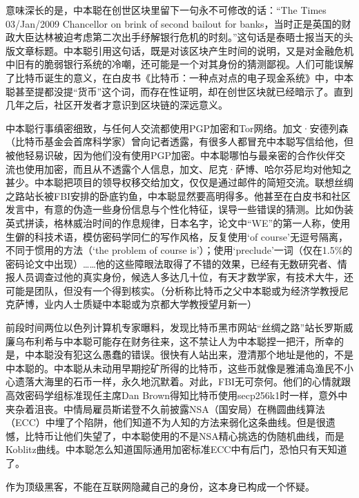 \documentclass{article}
\begin{document}
	意味深长的是，中本聪在创世区块里留下一句永不可修改的话：“The Times 03/Jan/2009 Chancellor on brink of second bailout for banks，当时正是英国的财政大臣达林被迫考虑第二次出手纾解银行危机的时刻。”这句话是泰晤士报当天的头版文章标题。中本聪引用这句话，既是对该区块产生时间的说明，又是对金融危机中旧有的脆弱银行系统的冷嘲，还可能是一个对其身份的猜测鄙视。人们可能误解了比特币诞生的意义，在白皮书《比特币：一种点对点的电子现金系统》中，中本聪甚至提都没提“货币”这个词，而存在性证明，却在创世区块就已经暗示了。直到几年之后，社区开发者才意识到区块链的深远意义。\par
	中本聪行事缜密细致，与任何人交流都使用PGP加密和Tor网络。加文·安德列森（比特币基金会首席科学家）曾向记者透露，有很多人都冒充中本聪写信给他，但被他轻易识破，因为他们没有使用PGP加密。中本聪哪怕与最亲密的合作伙伴交流也使用加密，而且从不透露个人信息，加文、尼克·萨博、哈尔芬尼均对他知之甚少。中本聪把项目的领导权移交给加文，仅仅是通过邮件的简短交流。联想丝绸之路站长被FBI安排的卧底钓鱼，中本聪显然要高明得多。他甚至在白皮书和社区发言中，有意的伪造一些身份信息与个性化特征，误导一些错误的猜测。比如伪装英式拼读，格林威治时间的作息规律，日本名字，论文中“WE”的第一人称，使用生僻的科技术语，模仿密码学同仁的写作风格，反复使用‘of course’无逗号隔离，不同于惯用的方法（‘the problem of course is’）；使用‘preclude’一词（仅在1.5\%的密码论文中出现）……他的这些障眼法取得了不错的效果，已经有无数研究者、情报人员调查过他的真实身份，候选人多达几十位，有天才数学家，有技术大牛，还可能是团队，但没有一个得到核实。（分析称比特币之父中本聪或为经济学教授尼克萨博，业内人士质疑中本聪或为京都大学教授望月新一）\par
	前段时间两位以色列计算机专家曝料，发现比特币黑市网站“丝绸之路”站长罗斯威廉乌布利希与中本聪可能存在财务往来，这不禁让人为中本聪捏一把汗，所幸的是，中本聪没有犯这么愚蠢的错误。很快有人站出来，澄清那个地址是他的，不是中本聪的。中本聪从未动用早期挖矿所得的比特币，这些币就像是雅浦岛渔民不小心遗落大海里的石币一样，永久地沉默着。对此，FBI无可奈何。他们的心情就跟高效密码学组标准现任主席Dan Brown得知比特币使用secp256k1时一样，意外中夹杂着沮丧。中情局雇员斯诺登不久前披露NSA（国安局）在椭圆曲线算法（ECC）中埋了个陷阱，他们知道不为人知的方法来弱化这条曲线。但是很遗憾，比特币让他们失望了，中本聪使用的不是NSA精心挑选的伪随机曲线，而是Koblitz曲线。中本聪怎么知道国际通用加密标准ECC中有后门，恐怕只有天知道了。\par
	作为顶级黑客，不能在互联网隐藏自己的身份，这本身已构成一个怀疑。\par
\end{document}
